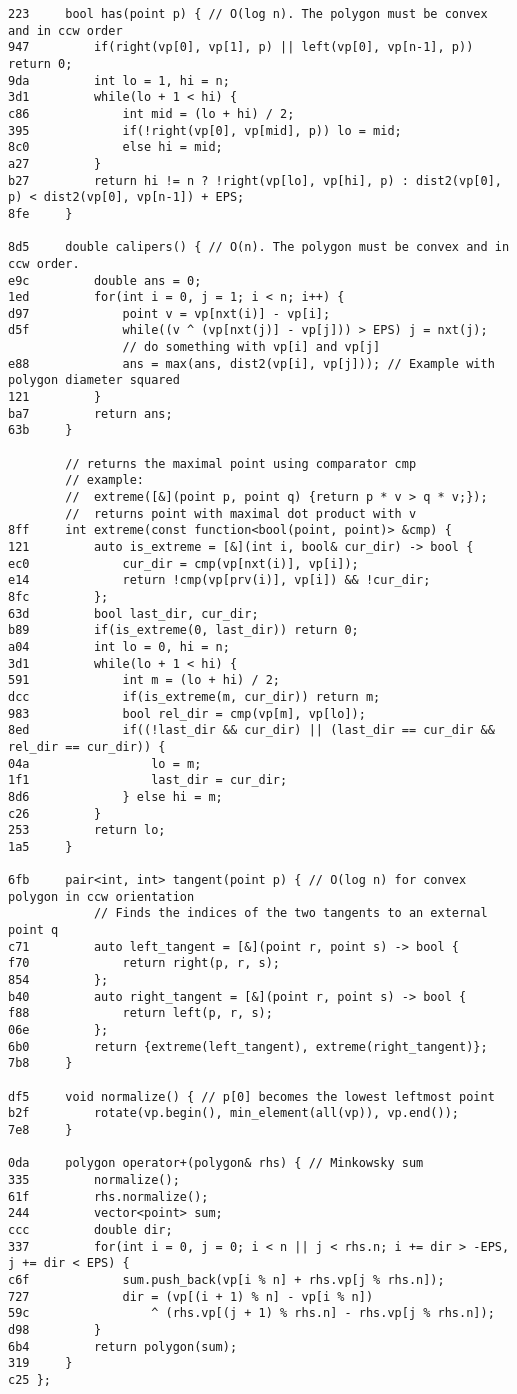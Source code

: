 \documentclass[11pt, a4paper, twoside]{article}
\begin{document}
\begin{lstlisting}
223 	bool has(point p) { // O(log n). The polygon must be convex and in ccw order
947 		if(right(vp[0], vp[1], p) || left(vp[0], vp[n-1], p)) return 0;
9da 		int lo = 1, hi = n;
3d1 		while(lo + 1 < hi) {
c86 			int mid = (lo + hi) / 2;
395 			if(!right(vp[0], vp[mid], p)) lo = mid;
8c0 			else hi = mid;
a27 		}
b27 		return hi != n ? !right(vp[lo], vp[hi], p) : dist2(vp[0], p) < dist2(vp[0], vp[n-1]) + EPS;
8fe 	}
    
8d5 	double calipers() { // O(n). The polygon must be convex and in ccw order.
e9c 		double ans = 0;
1ed 		for(int i = 0, j = 1; i < n; i++) {
d97 			point v = vp[nxt(i)] - vp[i];
d5f 			while((v ^ (vp[nxt(j)] - vp[j])) > EPS) j = nxt(j);
    			// do something with vp[i] and vp[j]
e88 			ans = max(ans, dist2(vp[i], vp[j])); // Example with polygon diameter squared
121 		}
ba7 		return ans;
63b 	}
    
    	// returns the maximal point using comparator cmp
    	// example: 
    	// 	extreme([&](point p, point q) {return p * v > q * v;});
    	// 	returns point with maximal dot product with v
8ff 	int extreme(const function<bool(point, point)> &cmp) {
121 		auto is_extreme = [&](int i, bool& cur_dir) -> bool {
ec0 			cur_dir = cmp(vp[nxt(i)], vp[i]);
e14 			return !cmp(vp[prv(i)], vp[i]) && !cur_dir;
8fc 		};
63d 		bool last_dir, cur_dir;
b89 		if(is_extreme(0, last_dir)) return 0;
a04 		int lo = 0, hi = n; 
3d1 		while(lo + 1 < hi) {
591 			int m = (lo + hi) / 2;
dcc 			if(is_extreme(m, cur_dir)) return m;
983 			bool rel_dir = cmp(vp[m], vp[lo]);
8ed 			if((!last_dir && cur_dir) || (last_dir == cur_dir && rel_dir == cur_dir)) {
04a 				lo = m;
1f1 				last_dir = cur_dir;
8d6 			} else hi = m;
c26 		}
253 		return lo;
1a5 	}
    
6fb 	pair<int, int> tangent(point p) { // O(log n) for convex polygon in ccw orientation
    		// Finds the indices of the two tangents to an external point q
c71 		auto left_tangent = [&](point r, point s) -> bool {
f70 			return right(p, r, s);
854 		};
b40 		auto right_tangent = [&](point r, point s) -> bool {
f88 			return left(p, r, s);
06e 		};
6b0 		return {extreme(left_tangent), extreme(right_tangent)};
7b8 	}
    
df5 	void normalize() { // p[0] becomes the lowest leftmost point 
b2f 		rotate(vp.begin(), min_element(all(vp)), vp.end());
7e8 	}
    
0da 	polygon operator+(polygon& rhs) { // Minkowsky sum
335 		normalize();
61f 		rhs.normalize();
244 		vector<point> sum;
ccc 		double dir;
337 		for(int i = 0, j = 0; i < n || j < rhs.n; i += dir > -EPS, j += dir < EPS) {
c6f 			sum.push_back(vp[i % n] + rhs.vp[j % rhs.n]);
727 			dir = (vp[(i + 1) % n] - vp[i % n]) 
59c 				^ (rhs.vp[(j + 1) % rhs.n] - rhs.vp[j % rhs.n]);
d98 		}
6b4 		return polygon(sum);
319 	}
c25 };


\end{lstlisting}
\end{document}
